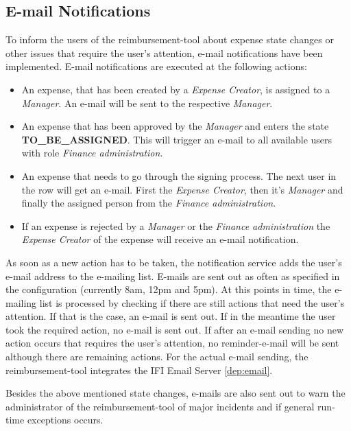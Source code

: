 \subsection{E-mail Notifications}
\label{feature:notification}

To inform the users of the reimbursement-tool about expense state changes or other issues that require the user's attention, e-mail notifications have been implemented.
E-mail notifications are executed at the following actions:
\begin{itemize}
	\item An expense, that has been created by a \textit{Expense Creator}, is assigned to a \textit{Manager}. An e-mail will be sent to the respective \textit{Manager}.
	\item An expense that has been approved by the \textit{Manager} and enters the state \newline \textbf{TO\_BE\_ASSIGNED}. This will trigger an e-mail to all available users with role \textit{Finance administration}.
	\item An expense that needs to go through the signing process. The next user in the row will get an e-mail. First the \textit{Expense Creator}, then it's \textit{Manager} and finally the assigned person from the \textit{Finance administration}.
	\item If an expense is rejected by a \textit{Manager} or the \textit{Finance administration} the \textit{Expense Creator} of the expense will receive an e-mail notification.
\end{itemize}

As soon as a new action has to be taken, the notification service adds the user's e-mail address to the e-mailing list. E-mails are sent out as often as specified in the configuration (currently 8am, 12pm and 5pm). At this points in time, the e-mailing list is processed by checking if there are still actions that need the user's attention. If that is the case, an e-mail is sent out. If in the meantime the user took the required action, no e-mail is sent out. If after an e-mail sending no new action occurs that requires the user's attention, no reminder-e-mail will be sent although there are remaining actions. For the actual e-mail sending, the reimbursement-tool integrates the IFI Email Server \ref{dep:email}.

Besides the above mentioned state changes, e-mails are also sent out to warn the administrator of the reimbursement-tool of major incidents and if general run-time exceptions occurs.


